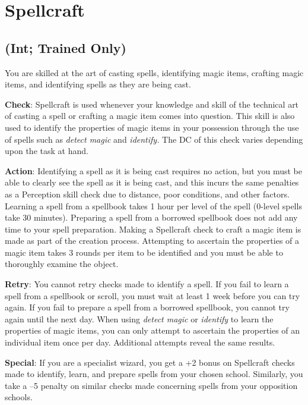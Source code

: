 \section{Spellcraft}

\label{f0}
\subsection{(Int; Trained Only)}

				
You are skilled at the art of casting spells, identifying magic items, crafting magic items, and identifying spells as they are being cast.
				
\textbf{Check}: Spellcraft is used whenever your knowledge and skill of the technical art of casting a spell or crafting a magic item comes into question. This skill is also used to identify the properties of magic items in your possession through the use of spells such as \textit{detect magic} and \textit{identify. }The DC of this check varies depending upon the task at hand.
				
\textbf{Action}: Identifying a spell as it is being cast requires no action, but you must be able to clearly see the spell as it is being cast, and this incurs the same penalties as a Perception skill check due to distance, poor conditions, and other factors. Learning a spell from a spellbook takes 1 hour per level of the spell (0-level spells take 30 minutes). Preparing a spell from a borrowed spellbook does not add any time to your spell preparation. Making a Spellcraft check to craft a magic item is made as part of the creation process. Attempting to ascertain the properties of a magic item takes 3 rounds per item to be identified and you must be able to thoroughly examine the object.
				
\textbf{Retry}: You cannot retry checks made to identify a spell. If you fail to learn a spell from a spellbook or scroll, you must wait at least 1 week before you can try again. If you fail to prepare a spell from a borrowed spellbook, you cannot try again until the next day. When using \textit{detect magic }or \textit{identify} to learn the properties of magic items, you can only attempt to ascertain the properties of an individual item once per day. Additional attempts reveal the same results.
				
\textbf{Special}: If you are a specialist wizard, you get a +2 bonus on Spellcraft checks made to identify, learn, and prepare spells from your chosen school. Similarly, you take a --5 penalty on similar checks made concerning spells from your opposition schools. 
				
